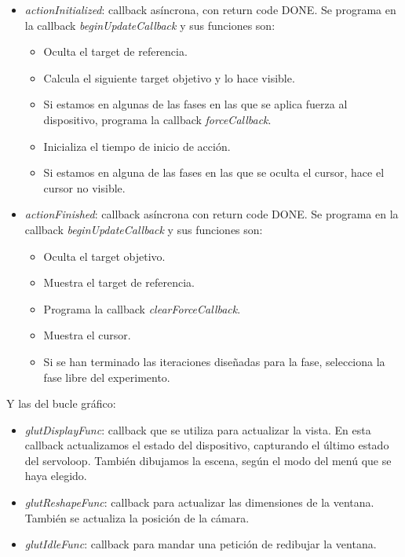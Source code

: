 \documentclass[a4paper,11pt, oneside]{book}
\begin{document}
\begin{itemize}
	\item \textit{actionInitialized}: callback asíncrona, con return code DONE. Se programa en la callback \textit{beginUpdateCallback} y sus funciones son:
	\begin{itemize}
		\item Oculta el target de referencia.
		\item Calcula el siguiente target objetivo y lo hace visible.
		\item Si estamos en algunas de las fases en las que se aplica fuerza al dispositivo, programa la callback \textit{forceCallback}. 
		\item Inicializa el tiempo de inicio de acción.
		\item Si estamos en alguna de las fases en las que se oculta el cursor, hace el cursor no visible.
	\end{itemize}
	
	\item \textit{actionFinished}: callback asíncrona con return code DONE. Se programa en la callback \textit{beginUpdateCallback} y sus funciones son:
	\begin{itemize}
		\item Oculta el target objetivo.
		\item Muestra el target de referencia.
		\item Programa la callback \textit{clearForceCallback}.
		\item Muestra el cursor.
		\item Si se han terminado las iteraciones diseñadas para la fase, selecciona la fase libre del experimento.
	\end{itemize}
\end{itemize}
Y las del bucle gráfico:
\begin{itemize}
	\item \textit{glutDisplayFunc}: callback que se utiliza para actualizar la vista. En esta callback actualizamos el estado del dispositivo, capturando el último estado del servoloop. También dibujamos la escena, según el modo del menú que se haya elegido. 
	
	\item \textit{glutReshapeFunc}: callback para actualizar las dimensiones de la ventana. También se actualiza la posición de la cámara.
	
	\item \textit{glutIdleFunc}: callback para mandar una petición de redibujar la ventana.	
\end{itemize}
\end{document}
